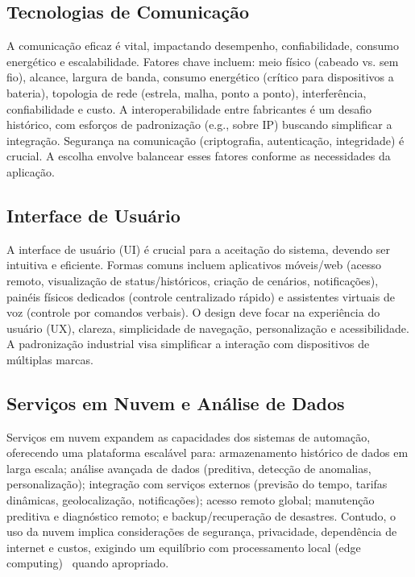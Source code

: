 \subsection{Tecnologias de Comunicação}
A comunicação eficaz é vital, impactando desempenho, confiabilidade, consumo energético e escalabilidade. Fatores chave incluem: meio físico (cabeado vs. sem fio), alcance, largura de banda, consumo energético (crítico para dispositivos a bateria), topologia de rede (estrela, malha, ponto a ponto), interferência, confiabilidade e custo. A interoperabilidade entre fabricantes é um desafio histórico, com esforços de padronização (e.g., sobre IP) buscando simplificar a integração. Segurança na comunicação (criptografia, autenticação, integridade) é crucial. A escolha envolve balancear esses fatores conforme as necessidades da aplicação.

\subsection{Interface de Usuário}
A interface de usuário (UI) é crucial para a aceitação do sistema, devendo ser intuitiva e eficiente. Formas comuns incluem aplicativos móveis/web (acesso remoto, visualização de status/históricos, criação de cenários, notificações), painéis físicos dedicados (controle centralizado rápido) e assistentes virtuais de voz (controle por comandos verbais). O design deve focar na experiência do usuário (UX), clareza, simplicidade de navegação, personalização e acessibilidade. A padronização industrial visa simplificar a interação com dispositivos de múltiplas marcas.

\subsection{Serviços em Nuvem e Análise de Dados}
Serviços em nuvem expandem as capacidades dos sistemas de automação, oferecendo uma plataforma escalável para: armazenamento histórico de dados em larga escala; análise avançada de dados (preditiva, detecção de anomalias, personalização); integração com serviços externos (previsão do tempo, tarifas dinâmicas, geolocalização, notificações); acesso remoto global; manutenção preditiva e diagnóstico remoto; e backup/recuperação de desastres. Contudo, o uso da nuvem implica considerações de segurança, privacidade, dependência de internet e custos, exigindo um equilíbrio com processamento local (edge computing)~\cite{Shi2016Edge} quando apropriado.

